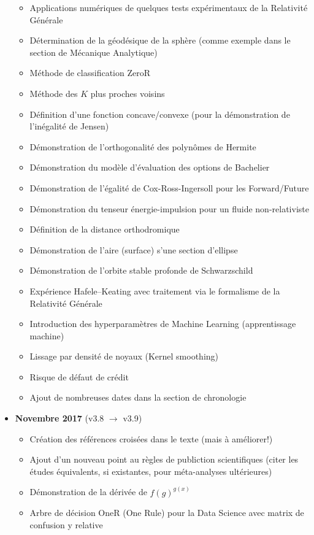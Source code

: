 \begin{itemize}
\begin{itemize}[noitemsep]
				\item Applications numériques de quelques tests expérimentaux de la Relativité Générale
				\item Détermination de la géodésique de la sphère (comme exemple dans le section de Mécanique Analytique)
				\item Méthode de classification ZeroR
				\item Méthode des $K$ plus proches voisins
				\item Définition d'une fonction concave/convexe (pour la démonstration de l'inégalité de Jensen)
				\item Démonstration de l'orthogonalité des polynômes de Hermite
				\item Démonstration du modèle d'évaluation des options de Bachelier
				\item Démonstration de l'égalité de Cox-Ross-Ingersoll pour les Forward/Future
				\item Démonstration du tenseur énergie-impulsion pour un fluide non-relativiste
				\item Définition de la distance orthodromique
				\item Démonstration de l'aire (surface) s'une section d'ellipse
				\item Démonstration de l'orbite stable profonde de Schwarzschild
				\item Expérience Hafele–Keating avec traitement via le formalisme de la Relativité Générale
				\item Introduction des hyperparamètres de Machine Learning (apprentissage machine)
				\item Lissage par densité de noyaux (Kernel smoothing)
				\item Risque de défaut de crédit
				\item Ajout de nombreuses dates dans la section de chronologie
			\end{itemize}
		\item \textbf{Novembre 2017} (v3.8 $\rightarrow$ v3.9)
			\begin{itemize}[noitemsep]
				\item Création des références croisées dans le texte (mais à améliorer!)
				\item Ajout d'un nouveau point au règles de publiction scientifiques (citer les études équivalents, si existantes, pour méta-analyses ultérieures)
				\item Démonstration de la dérivée de $f(g)^{g(x)}$
				\item Arbre de décision OneR (One Rule) pour la Data Science avec matrix de confusion y relative

\end{itemize}
\end{itemize}
